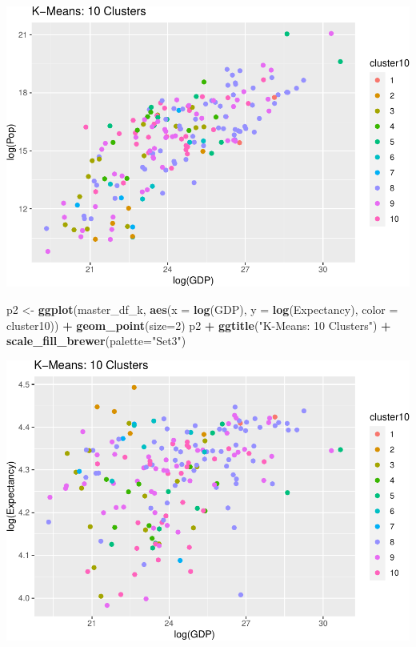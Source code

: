 \documentclass[]{article}
\newenvironment{Shaded}{\begin{snugshade}}{\end{snugshade}}
\newcommand{\DataTypeTok}[1]{\textcolor[rgb]{0.13,0.29,0.53}{#1}}
\newcommand{\DecValTok}[1]{\textcolor[rgb]{0.00,0.00,0.81}{#1}}
\newcommand{\KeywordTok}[1]{\textcolor[rgb]{0.13,0.29,0.53}{\textbf{#1}}}
\newcommand{\NormalTok}[1]{#1}
\newcommand{\OperatorTok}[1]{\textcolor[rgb]{0.81,0.36,0.00}{\textbf{#1}}}
\newcommand{\StringTok}[1]{\textcolor[rgb]{0.31,0.60,0.02}{#1}}
\begin{document}
\includegraphics{eda_files/figure-latex/unnamed-chunk-29-1.pdf}

\begin{Shaded}
\begin{Highlighting}[]
\NormalTok{p2 <-}\StringTok{ }\KeywordTok{ggplot}\NormalTok{(master_df_k, }\KeywordTok{aes}\NormalTok{(}\DataTypeTok{x =} \KeywordTok{log}\NormalTok{(GDP), }\DataTypeTok{y =} \KeywordTok{log}\NormalTok{(Expectancy), }\DataTypeTok{color =}\NormalTok{ cluster10)) }\OperatorTok{+}
\StringTok{  }\KeywordTok{geom_point}\NormalTok{(}\DataTypeTok{size=}\DecValTok{2}\NormalTok{)}
\NormalTok{p2 }\OperatorTok{+}\StringTok{ }\KeywordTok{ggtitle}\NormalTok{(}\StringTok{"K-Means: 10 Clusters"}\NormalTok{) }\OperatorTok{+}\StringTok{ }\KeywordTok{scale_fill_brewer}\NormalTok{(}\DataTypeTok{palette=}\StringTok{"Set3"}\NormalTok{)}
\end{Highlighting}
\end{Shaded}

\includegraphics{eda_files/figure-latex/unnamed-chunk-29-2.pdf}
\end{document}
